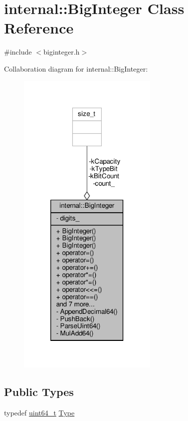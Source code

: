 \hypertarget{classinternal_1_1BigInteger}{}\section{internal\+:\+:Big\+Integer Class Reference}
\label{classinternal_1_1BigInteger}


{\ttfamily \#include $<$biginteger.\+h$>$}



Collaboration diagram for internal\+:\+:Big\+Integer\+:
\nopagebreak
\begin{figure}[H]
\begin{center}
\leavevmode
\includegraphics[width=188pt]{classinternal_1_1BigInteger__coll__graph}
\end{center}
\end{figure}
\subsection*{Public Types}
\begin{DoxyCompactItemize}
\item 
typedef \hyperlink{stdint_8h_aec6fcb673ff035718c238c8c9d544c47}{uint64\+\_\+t} \hyperlink{classinternal_1_1BigInteger_a1310812fca26ebae77594ba08678fc4c}{Type}
\end{DoxyCompactItemize}
